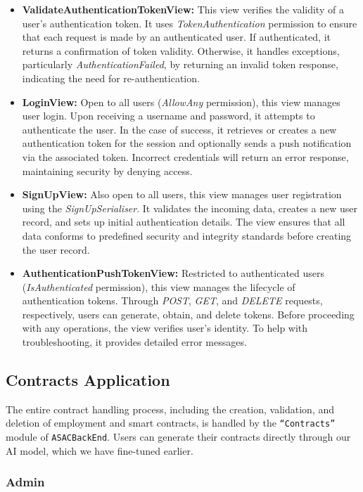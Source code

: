 \begin{itemize}
    \item \textbf{ValidateAuthenticationTokenView:} This view verifies the validity of a user's authentication token. It uses \textit{TokenAuthentication} permission to ensure that each request is made by an authenticated user. If authenticated, it returns a confirmation of token validity. Otherwise, it handles exceptions, particularly \textit{AuthenticationFailed}, by returning an invalid token response, indicating the need for re-authentication.
    \item \textbf{LoginView:} Open to all users (\textit{AllowAny} permission), this view manages user login. Upon receiving a username and password, it attempts to authenticate the user. In the case of success, it retrieves or creates a new authentication token for the session and optionally sends a push notification via the associated token. Incorrect credentials will return an error response, maintaining security by denying access.
    \item \textbf{SignUpView:} Also open to all users, this view manages user registration using the \textit{SignUpSerialiser}. It validates the incoming data, creates a new user record, and sets up initial authentication details. The view ensures that all data conforms to predefined security and integrity standards before creating the user record.
    \item \textbf{AuthenticationPushTokenView:} Restricted to authenticated users (\textit{IsAuthenticated} permission), this view manages the lifecycle of authentication tokens. Through \textit{POST}, \textit{GET}, and \textit{DELETE} requests, respectively, users can generate, obtain, and delete tokens. Before proceeding with any operations, the view verifies user's identity. To help with troubleshooting, it provides detailed error messages.
\end{itemize}

\subsection{Contracts Application}

The entire contract handling process, including the creation, validation, and deletion of employment and smart contracts, is handled by the \texttt{``Contracts''} module of \texttt{ASACBackEnd}. Users can generate their contracts directly through our AI model, which we have fine-tuned earlier.

\subsubsection{Admin} 

